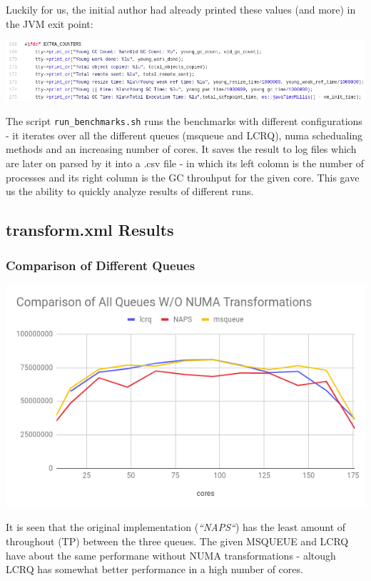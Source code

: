 \documentclass{article}
\begin{document}
 Luckily for us, the initial author had already printed these values (and more) in the JVM exit point:

 \includegraphics[width=\textwidth]{gc-debug-prints.png}

 The script \texttt{run\_benchmarks.sh} runs the benchmarks with different configurations - it iterates over all the different queues (msqueue and LCRQ), numa schedualing methods and an increasing number of cores. It saves the result to log files which are later on parsed by it into a .csv file - in which its left colomn is the number of processes and its right column is the GC throuhput for the given core.
This gave us the ability to quickly analyze results of different runs.

 \newpage

 \subsection{transform.xml Results}
 \subsubsection{Comparison of Different Queues}

 \includegraphics[width=\textwidth]{graph-no-schedule.png}

 It is seen that the original implementation (\textit{``NAPS``}) has the least amount of throughout (TP) between the three queues. The given MSQUEUE and LCRQ have about the same performane without NUMA transformations - altough LCRQ has somewhat better performance in a high number of cores.
\end{document}
